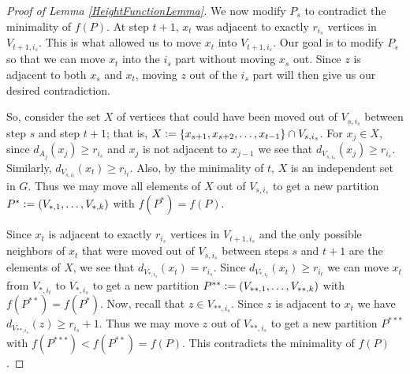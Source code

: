 \begin{proof}[Proof of Lemma \ref{HeightFunctionLemma}]
We now modify $P_s$ to contradict the minimality of $f(P)$.  At step $t+1$,  $x_t$ was adjacent to exactly $r_{i_s}$ vertices in $V_{t+1, i_s}$. This is what allowed us to move $x_t$ into $V_{t+1, i_s}$.  Our goal is to modify $P_s$ so that we can move $x_t$ into the $i_s$ part without moving $x_s$ out. Since $z$ is adjacent to both $x_s$ and $x_t$, moving $z$ out of the $i_s$ part will then give us our desired contradiction.  

So, consider the set $X$ of vertices that could have been moved out of $V_{s, i_s}$ between step $s$ and step $t+1$; that is, $X \mathrel{\mathop:}= \left\{ x_{s+1}, x_{s+2}, \ldots, x_{t-1} \right\} \cap V_{s, i_s}$.  For $x_j \in X$, since $d_{A_j}(x_j) \geq r_{i_s}$ and $x_j$ is not adjacent to $x_{j-1}$ we see that $d_{V_{s, i_s}}(x_j) \geq r_{i_s}$.  Similarly, $d_{V_{s, i_t}}(x_t) \geq r_{i_t}$. Also, by the minimality of $t$, $X$ is an independent set in $G$.  Thus we may move all elements of $X$ out of $V_{s, i_s}$ to get a new partition $P^* \mathrel{\mathop:}= \left( V_{*, 1}, \ldots, V_{*, k} \right)$ with $f(P^*) = f(P)$. 

Since $x_t$ is adjacent to exactly $r_{i_s}$ vertices in $V_{t+1, i_s}$ and the only possible neighbors of $x_t$ that were moved out of $V_{s, i_s}$ between steps $s$ and $t+1$ are the elements of $X$, we see that $d_{V_{*, i_s}}(x_t) = r_{i_s}$.  Since $d_{V_{*, i_t}}(x_t) \geq r_{i_t}$ we can move $x_t$ from $V_{*, i_t}$ to $V_{*, i_s}$ to get a new partition $P^{**} \mathrel{\mathop:}= \left( V_{**, 1}, \ldots, V_{**, k} \right)$ with $f(P^{**}) = f(P^*)$.  Now, recall that $z \in V_{**, i_s}$.  Since $z$ is adjacent to $x_t$ we have $d_{V_{**, i_s}}(z) \geq r_{i_s} + 1$.  Thus we may move $z$ out of $V_{**, i_s}$ to get a new partition $P^{***}$ with $f(P^{***}) < f(P^{**}) = f(P)$.  This contradicts the minimality of $f(P)$.
\end{proof}
